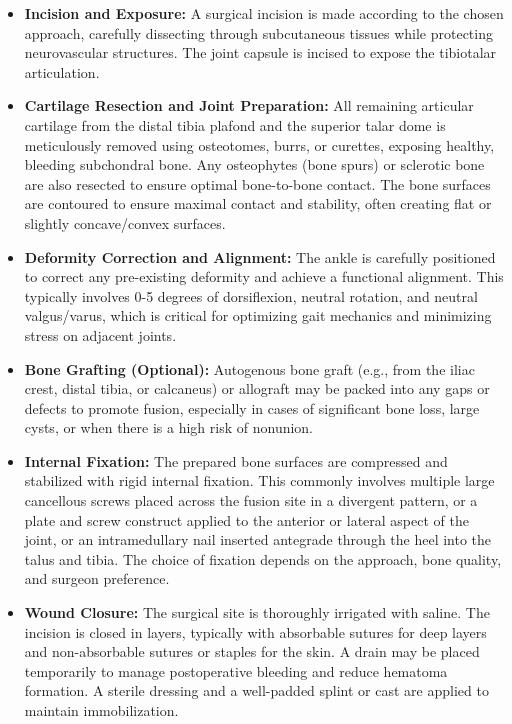 \begin{itemize}
  \item \textbf{Incision and Exposure:} A surgical incision is made according to the chosen approach, carefully dissecting through subcutaneous tissues while protecting neurovascular structures. The joint capsule is incised to expose the tibiotalar articulation.
  
  \item \textbf{Cartilage Resection and Joint Preparation:} All remaining articular cartilage from the distal tibia plafond and the superior talar dome is meticulously removed using osteotomes, burrs, or curettes, exposing healthy, bleeding subchondral bone. Any osteophytes (bone spurs) or sclerotic bone are also resected to ensure optimal bone-to-bone contact. The bone surfaces are contoured to ensure maximal contact and stability, often creating flat or slightly concave/convex surfaces.
  
  \item \textbf{Deformity Correction and Alignment:} The ankle is carefully positioned to correct any pre-existing deformity and achieve a functional alignment. This typically involves 0-5 degrees of dorsiflexion, neutral rotation, and neutral valgus/varus, which is critical for optimizing gait mechanics and minimizing stress on adjacent joints.
  
  \item \textbf{Bone Grafting (Optional):} Autogenous bone graft (e.g., from the iliac crest, distal tibia, or calcaneus) or allograft may be packed into any gaps or defects to promote fusion, especially in cases of significant bone loss, large cysts, or when there is a high risk of nonunion.
  
  \item \textbf{Internal Fixation:} The prepared bone surfaces are compressed and stabilized with rigid internal fixation. This commonly involves multiple large cancellous screws placed across the fusion site in a divergent pattern, or a plate and screw construct applied to the anterior or lateral aspect of the joint, or an intramedullary nail inserted antegrade through the heel into the talus and tibia. The choice of fixation depends on the approach, bone quality, and surgeon preference.
  
  \item \textbf{Wound Closure:} The surgical site is thoroughly irrigated with saline. The incision is closed in layers, typically with absorbable sutures for deep layers and non-absorbable sutures or staples for the skin. A drain may be placed temporarily to manage postoperative bleeding and reduce hematoma formation. A sterile dressing and a well-padded splint or cast are applied to maintain immobilization.
\end{itemize}

